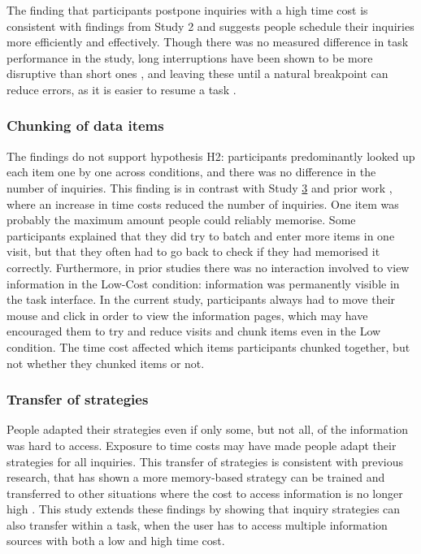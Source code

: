 The finding that participants postpone inquiries with a high time cost is consistent with findings from Study 2 and suggests people schedule their inquiries more efficiently and effectively. Though there was no measured difference in task performance in the study, long interruptions have been shown to be more disruptive than short ones \citep{Altmann2017, Monk2008}, and leaving these until a natural breakpoint can reduce errors, as it is easier to resume a task \citep{Gould2013a, Iqbal2005}.

\subsubsection{Chunking of data items}
The findings do not support hypothesis H2: participants predominantly looked up each item one by one across conditions, and there was no difference in the number of inquiries. This finding is in contrast with Study \hyperref[st:Study3]{3} and prior work \citep{Gray2006}, where an increase in time costs reduced the number of inquiries. One item was probably the maximum amount people could reliably memorise. Some participants explained that they did try to batch and enter more items in one visit, but that they often had to go back to check if they had memorised it correctly. Furthermore, in prior studies there was no interaction involved to view information in the Low-Cost condition: information was permanently visible in the task interface. In the current study, participants always had to move their mouse and click in order to view the information pages, which may have encouraged them to try and reduce visits and chunk items even in the Low condition. The time cost affected which items participants chunked together, but not whether they chunked items or not.

\subsubsection{Transfer of strategies}
People adapted their strategies even if only some, but not all, of the information was hard to access. Exposure to time costs may have made people adapt their strategies for all inquiries. This transfer of strategies is consistent with previous research, that has shown a more memory-based strategy can be trained and transferred to other situations where the cost to access information is no longer high \citep{Patrick2014}. This study extends these findings by showing that inquiry strategies can also transfer within a task, when the user has to access multiple information sources with both a low and high time cost.

